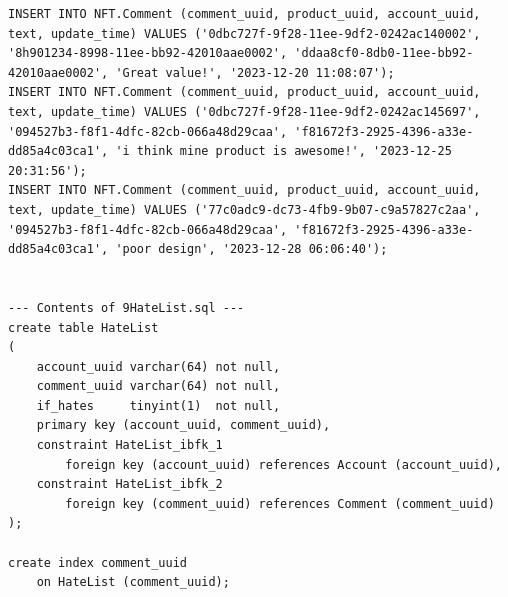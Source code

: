 \documentclass[a4paper, 12pt]{article}
\begin{document}
\begin{lstlisting}
INSERT INTO NFT.Comment (comment_uuid, product_uuid, account_uuid, text, update_time) VALUES ('0dbc727f-9f28-11ee-9df2-0242ac140002', '8h901234-8998-11ee-bb92-42010aae0002', 'ddaa8cf0-8db0-11ee-bb92-42010aae0002', 'Great value!', '2023-12-20 11:08:07');
INSERT INTO NFT.Comment (comment_uuid, product_uuid, account_uuid, text, update_time) VALUES ('0dbc727f-9f28-11ee-9df2-0242ac145697', '094527b3-f8f1-4dfc-82cb-066a48d29caa', 'f81672f3-2925-4396-a33e-dd85a4c03ca1', 'i think mine product is awesome!', '2023-12-25 20:31:56');
INSERT INTO NFT.Comment (comment_uuid, product_uuid, account_uuid, text, update_time) VALUES ('77c0adc9-dc73-4fb9-9b07-c9a57827c2aa', '094527b3-f8f1-4dfc-82cb-066a48d29caa', 'f81672f3-2925-4396-a33e-dd85a4c03ca1', 'poor design', '2023-12-28 06:06:40');


--- Contents of 9HateList.sql ---
create table HateList
(
    account_uuid varchar(64) not null,
    comment_uuid varchar(64) not null,
    if_hates     tinyint(1)  not null,
    primary key (account_uuid, comment_uuid),
    constraint HateList_ibfk_1
        foreign key (account_uuid) references Account (account_uuid),
    constraint HateList_ibfk_2
        foreign key (comment_uuid) references Comment (comment_uuid)
);

create index comment_uuid
    on HateList (comment_uuid);


\end{lstlisting}
\end{document}
